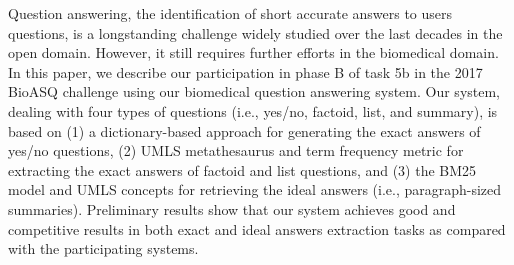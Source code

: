 Question answering, the identification of short accurate answers to users questions, is a longstanding challenge widely studied over the last decades in the open domain. However, it still requires further efforts in the biomedical domain. In this paper, we describe our participation in phase B of task 5b in the 2017 BioASQ challenge using our biomedical question answering system. Our system, dealing with four types of questions (i.e., yes/no, factoid, list, and summary), is based on (1) a dictionary-based approach for generating the exact answers of yes/no questions, (2) UMLS metathesaurus and term frequency metric for extracting the exact answers of factoid and list questions, and (3) the BM25 model and UMLS concepts for retrieving the ideal answers (i.e., paragraph-sized summaries). Preliminary results show that our system achieves good and competitive results in both exact and ideal answers extraction tasks as compared with the participating systems.

